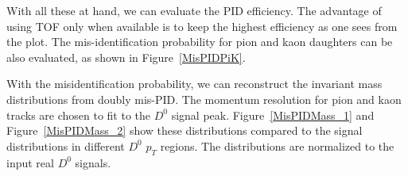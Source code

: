 \documentclass[a4paper]{article}
\begin{document}
\begin{figure}
\end{figure}

With all these at hand, we can evaluate the PID efficiency. The advantage of using TOF only when available is to keep the highest efficiency as one sees from the plot. The mis-identification probability for pion and kaon daughters can be also evaluated, as shown in Figure~\ref{MisPIDPiK}. 

\begin{figure}
\end{figure}

With the misidentification probability, we can reconstruct the invariant mass distributions from doubly mis-PID. The momentum resolution for pion and kaon tracks are chosen to fit to the $D^{0}$ signal peak. Figure~\ref{MisPIDMass_1} and Figure~\ref{MisPIDMass_2} show these distributions compared to the signal distributions in different $D^0$ $p_{T}$ regions. The distributions are normalized to the input real $D^{0}$ signals.
\end{document}

